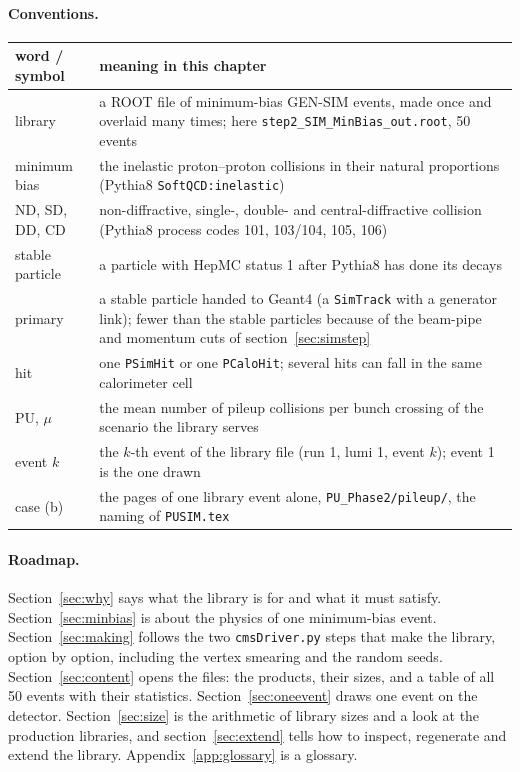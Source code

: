 \documentclass[11pt,a4paper]{article}
\newcommand{\code}[1]{\texttt{#1}}
\begin{document}
\paragraph{Conventions.}
\begin{center}\small
\begin{tabularx}{\textwidth}{>{\raggedright\arraybackslash}p{40mm}X}
\toprule
word / symbol & meaning in this chapter \\
\midrule
library & a ROOT file of minimum-bias GEN-SIM events, made once and overlaid many times; here
  \code{step2\_SIM\_MinBias\_out.root}, 50 events \\
minimum bias & the inelastic proton--proton collisions in their natural proportions
  (Pythia8 \code{SoftQCD:inelastic}) \\
ND, SD, DD, CD & non-diffractive, single-, double- and central-diffractive collision (Pythia8 process codes
  101, 103/104, 105, 106) \\
stable particle & a particle with HepMC status 1 after Pythia8 has done its decays \\
primary & a stable particle handed to Geant4 (a \code{SimTrack} with a generator link); fewer than the
  stable particles because of the beam-pipe and momentum cuts of section~\ref{sec:simstep} \\
hit & one \code{PSimHit} or one \code{PCaloHit}; several hits can fall in the same calorimeter cell \\
PU, $\mu$ & the mean number of pileup collisions per bunch crossing of the scenario the library serves \\
event $k$ & the $k$-th event of the library file (run 1, lumi 1, event $k$); event 1 is the one drawn \\
case (b) & the pages of one library event alone, \code{PU\_Phase2/pileup/}, the naming of \code{PUSIM.tex} \\
\bottomrule
\end{tabularx}
\end{center}

\paragraph{Roadmap.} Section~\ref{sec:why} says what the library is for and what it must satisfy.
Section~\ref{sec:minbias} is about the physics of one minimum-bias event. Section~\ref{sec:making} follows the
two \code{cmsDriver.py} steps that make the library, option by option, including the vertex smearing and the
random seeds. Section~\ref{sec:content} opens the files: the products, their sizes, and a table of all 50
events with their statistics. Section~\ref{sec:oneevent} draws one event on the detector.
Section~\ref{sec:size} is the arithmetic of library sizes and a look at the production libraries, and
section~\ref{sec:extend} tells how to inspect, regenerate and extend the library.
Appendix~\ref{app:glossary} is a glossary.
\end{document}
